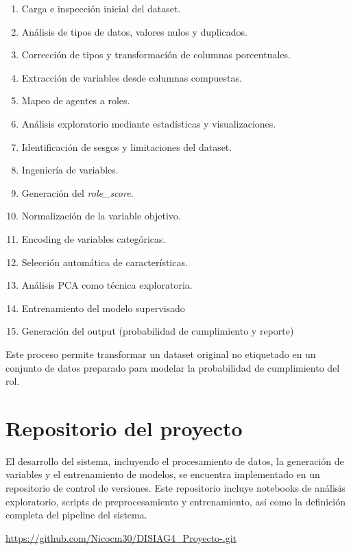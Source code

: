 \documentclass{ULBreport} %
\begin{document}
\begin{enumerate}
    \item Carga e inspección inicial del dataset.
    \item Análisis de tipos de datos, valores nulos y duplicados.
    \item Corrección de tipos y transformación de columnas porcentuales.
    \item Extracción de variables desde columnas compuestas.
    \item Mapeo de agentes a roles.
    \item Análisis exploratorio mediante estadísticas y visualizaciones.
    \item Identificación de sesgos y limitaciones del dataset.
    \item Ingeniería de variables.
    \item Generación del \textit{role\_score}.
    \item Normalización de la variable objetivo.
    \item Encoding de variables categóricas.
    \item Selección automática de características.
    \item Análisis PCA como técnica exploratoria.
    \item Entrenamiento del modelo supervisado
    \item Generación del output (probabilidad de cumplimiento y reporte)
\end{enumerate}

Este proceso permite transformar un dataset original no etiquetado en un conjunto de datos preparado para modelar la probabilidad de cumplimiento del rol.

\section{Repositorio del proyecto}

El desarrollo del sistema, incluyendo el procesamiento de datos, la generación de variables y el entrenamiento de modelos, se encuentra implementado en un repositorio de control de versiones. Este repositorio incluye notebooks de análisis exploratorio, scripts de preprocesamiento y entrenamiento, así como la definición completa del pipeline del sistema.

\begin{center}
\url{https://github.com/Nicocm30/DISIAG4_Proyecto-.git}
\end{center}
\end{document}
